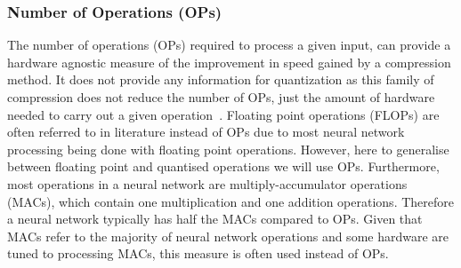 \subsubsection{Number of Operations (OPs)}
The number of operations (OPs) required to process a given input, can provide a hardware agnostic measure of the improvement in speed gained by a compression method.
%
It does not provide any information for quantization as this family of compression does not reduce the number of OPs, just the amount of hardware needed to carry out a given operation~\cite{Budgett2022}. 
%
%
Floating point operations (FLOPs) are often referred to in literature instead of OPs due to most neural network processing being done with floating point operations. However, here to generalise between floating point and quantised operations we will use OPs.
%
Furthermore, most operations in a neural network are multiply-accumulator operations (MACs), which contain one multiplication and one addition operations. Therefore a neural network typically has half the MACs compared to OPs. Given that MACs refer to the majority of neural network operations and some hardware are tuned to processing MACs, this measure is often used instead of OPs.  




%

